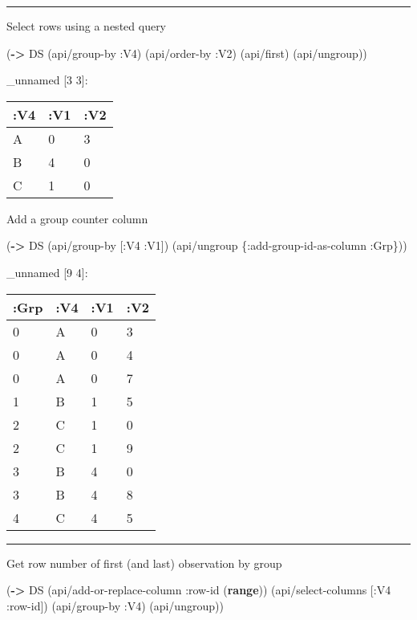 \documentclass[]{article}
\newenvironment{Shaded}{\begin{snugshade}}{\end{snugshade}}
\newcommand{\AttributeTok}[1]{\textcolor[rgb]{0.77,0.63,0.00}{#1}}
\newcommand{\KeywordTok}[1]{\textcolor[rgb]{0.13,0.29,0.53}{\textbf{#1}}}
\newcommand{\NormalTok}[1]{#1}
\begin{document}
\begin{center}\rule{0.5\linewidth}{0.5pt}\end{center}

Select rows using a nested query

\begin{Shaded}
\begin{Highlighting}[]
\NormalTok{(}\KeywordTok{->}\NormalTok{ DS}
\NormalTok{    (api/group-by }\AttributeTok{:V4}\NormalTok{)}
\NormalTok{    (api/order-by }\AttributeTok{:V2}\NormalTok{)}
\NormalTok{    (api/first)}
\NormalTok{    (api/ungroup))}
\end{Highlighting}
\end{Shaded}

\_unnamed {[}3 3{]}:

\begin{longtable}[]{@{}lll@{}}
\toprule
:V4 & :V1 & :V2\tabularnewline
\midrule
\endhead
A & 0 & 3\tabularnewline
B & 4 & 0\tabularnewline
C & 1 & 0\tabularnewline
\bottomrule
\end{longtable}

Add a group counter column

\begin{Shaded}
\begin{Highlighting}[]
\NormalTok{(}\KeywordTok{->}\NormalTok{ DS}
\NormalTok{    (api/group-by [}\AttributeTok{:V4} \AttributeTok{:V1}\NormalTok{])}
\NormalTok{    (api/ungroup \{}\AttributeTok{:add-group-id-as-column} \AttributeTok{:Grp}\NormalTok{\}))}
\end{Highlighting}
\end{Shaded}

\_unnamed {[}9 4{]}:

\begin{longtable}[]{@{}llll@{}}
\toprule
:Grp & :V4 & :V1 & :V2\tabularnewline
\midrule
\endhead
0 & A & 0 & 3\tabularnewline
0 & A & 0 & 4\tabularnewline
0 & A & 0 & 7\tabularnewline
1 & B & 1 & 5\tabularnewline
2 & C & 1 & 0\tabularnewline
2 & C & 1 & 9\tabularnewline
3 & B & 4 & 0\tabularnewline
3 & B & 4 & 8\tabularnewline
4 & C & 4 & 5\tabularnewline
\bottomrule
\end{longtable}

\begin{center}\rule{0.5\linewidth}{0.5pt}\end{center}

Get row number of first (and last) observation by group

\begin{Shaded}
\begin{Highlighting}[]
\NormalTok{(}\KeywordTok{->}\NormalTok{ DS}
\NormalTok{    (api/add-or-replace-column }\AttributeTok{:row-id}\NormalTok{ (}\KeywordTok{range}\NormalTok{))}
\NormalTok{    (api/select-columns [}\AttributeTok{:V4} \AttributeTok{:row-id}\NormalTok{])}
\NormalTok{    (api/group-by }\AttributeTok{:V4}\NormalTok{)}
\NormalTok{    (api/ungroup))}
\end{Highlighting}
\end{Shaded}
\end{document}
